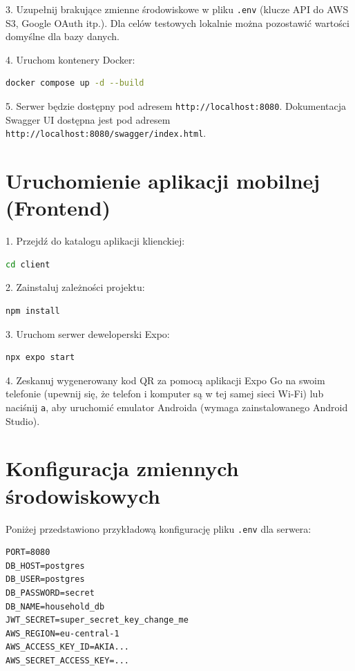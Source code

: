 3. Uzupełnij brakujące zmienne środowiskowe w pliku \texttt{.env} (klucze API do AWS S3, Google OAuth itp.). Dla celów testowych lokalnie można pozostawić wartości domyślne dla bazy danych.

4. Uruchom kontenery Docker:
\begin{lstlisting}[language=bash]
docker compose up -d --build
\end{lstlisting}

5. Serwer będzie dostępny pod adresem \texttt{http://localhost:8080}. Dokumentacja Swagger UI dostępna jest pod adresem \texttt{http://localhost:8080/swagger/index.html}.

\section{Uruchomienie aplikacji mobilnej (Frontend)}

1. Przejdź do katalogu aplikacji klienckiej:
\begin{lstlisting}[language=bash]
cd client
\end{lstlisting}

2. Zainstaluj zależności projektu:
\begin{lstlisting}[language=bash]
npm install
\end{lstlisting}

3. Uruchom serwer deweloperski Expo:
\begin{lstlisting}[language=bash]
npx expo start
\end{lstlisting}

4. Zeskanuj wygenerowany kod QR za pomocą aplikacji Expo Go na swoim telefonie (upewnij się, że telefon i komputer są w tej samej sieci Wi-Fi) lub naciśnij \texttt{a}, aby uruchomić emulator Androida (wymaga zainstalowanego Android Studio).

\section{Konfiguracja zmiennych środowiskowych}

Poniżej przedstawiono przykładową konfigurację pliku \texttt{.env} dla serwera:

\begin{lstlisting}[caption=Przykładowy plik .env]
PORT=8080
DB_HOST=postgres
DB_USER=postgres
DB_PASSWORD=secret
DB_NAME=household_db
JWT_SECRET=super_secret_key_change_me
AWS_REGION=eu-central-1
AWS_ACCESS_KEY_ID=AKIA...
AWS_SECRET_ACCESS_KEY=...
\end{lstlisting}
